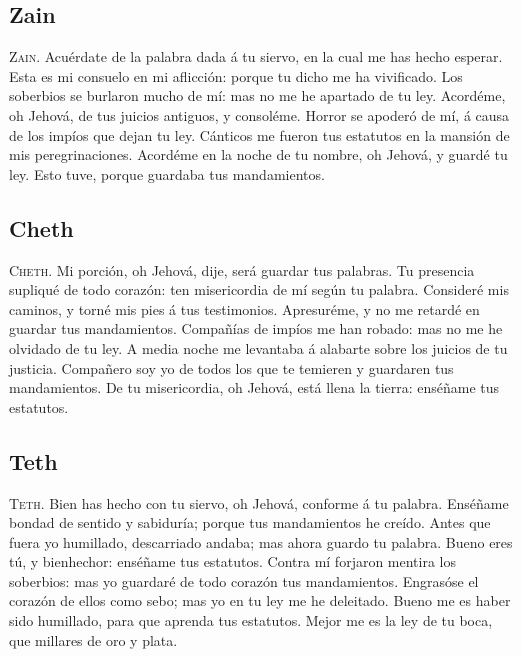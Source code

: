 \hypertarget{zain}{%
\subsection{Zain}\label{zain}}

 \textsc{Zain}. Acuérdate de la palabra dada á tu siervo,
en la cual me has hecho esperar.  Esta es mi consuelo en
mi aflicción: porque tu dicho me ha vivificado.  Los
soberbios se burlaron mucho de mí: mas no me he apartado de tu ley.
 Acordéme, oh Jehová, de tus juicios antiguos, y
consoléme.  Horror se apoderó de mí, á causa de los
impíos que dejan tu ley.  Cánticos me fueron tus
estatutos en la mansión de mis peregrinaciones.  Acordéme
en la noche de tu nombre, oh Jehová, y guardé tu ley. 
Esto tuve, porque guardaba tus mandamientos.

\hypertarget{cheth}{%
\subsection{Cheth}\label{cheth}}

 \textsc{Cheth}. Mi porción, oh Jehová, dije, será
guardar tus palabras.  Tu presencia supliqué de todo
corazón: ten misericordia de mí según tu palabra. 
Consideré mis caminos, y torné mis pies á tus testimonios.
 Apresuréme, y no me retardé en guardar tus mandamientos.
 Compañías de impíos me han robado: mas no me he olvidado
de tu ley.  A media noche me levantaba á alabarte sobre
los juicios de tu justicia.  Compañero soy yo de todos
los que te temieren y guardaren tus mandamientos.  De tu
misericordia, oh Jehová, está llena la tierra: enséñame tus estatutos.

\hypertarget{teth}{%
\subsection{Teth}\label{teth}}

 \textsc{Teth}. Bien has hecho con tu siervo, oh Jehová,
conforme á tu palabra.  Enséñame bondad de sentido y
sabiduría; porque tus mandamientos he creído.  Antes que
fuera yo humillado, descarriado andaba; mas ahora guardo tu palabra.
 Bueno eres tú, y bienhechor: enséñame tus estatutos.
 Contra mí forjaron mentira los soberbios: mas yo
guardaré de todo corazón tus mandamientos.  Engrasóse el
corazón de ellos como sebo; mas yo en tu ley me he deleitado.
 Bueno me es haber sido humillado, para que aprenda tus
estatutos.  Mejor me es la ley de tu boca, que millares
de oro y plata.

